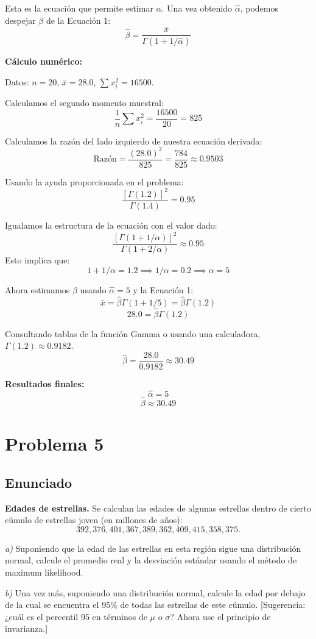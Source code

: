 \documentclass[12pt]{article}
\begin{document}
Esta es la ecuación que permite estimar $\alpha$. Una vez obtenido $\hat{\alpha}$, podemos despejar $\beta$ de la Ecuación 1:
$$ \hat{\beta} = \frac{\bar{x}}{\Gamma(1 + 1/\hat{\alpha})} $$

\textbf{Cálculo numérico:}

Datos: $n = 20$, $\bar{x} = 28.0$, $\sum x_i^2 = 16500$.

Calculamos el segundo momento muestral:
$$ \frac{1}{n}\sum x_i^2 = \frac{16500}{20} = 825 $$

Calculamos la razón del lado izquierdo de nuestra ecuación derivada:
$$ \text{Razón} = \frac{(28.0)^2}{825} = \frac{784}{825} \approx 0.9503 $$

Usando la ayuda proporcionada en el problema:
$$ \frac{[\Gamma(1.2)]^2}{\Gamma(1.4)} = 0.95 $$

Igualamos la estructura de la ecuación con el valor dado:
$$ \frac{[\Gamma(1 + 1/\alpha)]^2}{\Gamma(1 + 2/\alpha)} \approx 0.95 $$
Esto implica que:
$$ 1 + 1/\alpha = 1.2 \implies 1/\alpha = 0.2 \implies \alpha = 5 $$

Ahora estimamos $\beta$ usando $\hat{\alpha} = 5$ y la Ecuación 1:
$$ \bar{x} = \hat{\beta} \Gamma(1 + 1/5) = \hat{\beta} \Gamma(1.2) $$
$$ 28.0 = \hat{\beta} \Gamma(1.2) $$

Consultando tablas de la función Gamma o usando una calculadora, $\Gamma(1.2) \approx 0.9182$.
$$ \hat{\beta} = \frac{28.0}{0.9182} \approx 30.49 $$

\textbf{Resultados finales:}
$$ \hat{\alpha} = 5 $$
$$ \hat{\beta} \approx 30.49 $$


\section{Problema 5}

\subsection{Enunciado}
\textbf{Edades de estrellas.} Se calculan las edades de algunas estrellas dentro de cierto cúmulo de estrellas joven (en millones de años):
\[ 392, 376, 401, 367, 389, 362, 409, 415, 358, 375. \]

\textit{a)} Suponiendo que la edad de las estrellas en esta región sigue una distribución normal, calcule el promedio real y la desviación estándar usando el método de maximum likelihood.

\textit{b)} Una vez más, suponiendo una distribución normal, calcule la edad por debajo de la cual se encuentra el 95\% de todas las estrellas de este cúmulo. [Sugerencia: ¿cuál es el percentil 95 en términos de $\mu$ o $\sigma$? Ahora use el principio de invarianza.]
\end{document}
